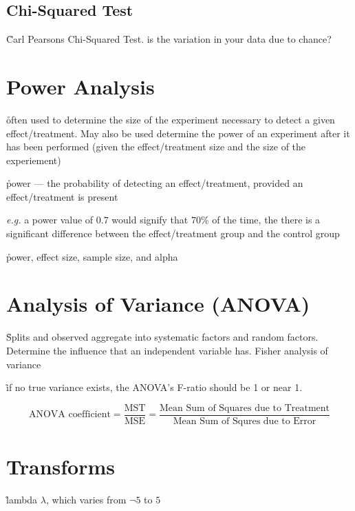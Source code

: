 \subsection{Chi-Squared Test}

\r{Carl Pearsons Chi-Squared Test. is the variation in your data due to chance?}


\section{Power Analysis}

\r{often used to determine the size of the experiment necessary to detect a given effect/treatment. May also be used determine the power of an experiment after it has been performed (given the effect/treatment size and the size of the experiement)}

\r{power --- the probability of detecting an effect/treatment, provided an effect/treatment is present}

\r{\textit{e.g.} a power value of $0.7$ would signify that $70\%$ of the time, the there is a significant difference between the effect/treatment group and the control group}

\r{power, effect size, sample size, and alpha}


\section{Analysis of Variance (ANOVA)}

\r{Splits and observed aggregate into systematic factors and random factors. Determine the influence that an independent variable has. Fisher analysis of variance\cite{fisher1992statistical}}

\r{if no true variance exists, the ANOVA's F-ratio should be 1 or near 1.}

\begin{equation}
	{\textrm{ANOVA coefficient} = \frac{ \textrm{MST}}{\textrm{MSE}} = \frac{  \textrm{Mean Sum of Squares due to Treatment}}{ 
			 \textrm{Mean Sum of Squres due to Error}}}
	\label{eq:anova}
\end{equation}


\section{Transforms}


\r{lambda $\lambda$, which varies from $\neg5$ to $5$}

